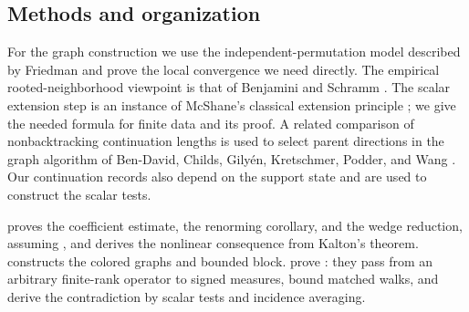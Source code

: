 \subsection{Methods and organization}

For the graph construction we use the independent-permutation model
described by Friedman \cite{Friedman04} and prove the local convergence
we need directly. The empirical rooted-neighborhood viewpoint is that
of Benjamini and Schramm \cite{BenjaminiSchramm01}. The scalar extension
step is an instance of McShane's classical extension principle
\cite{McShane34}; we give the needed formula for finite data and its proof.
A related comparison of nonbacktracking continuation lengths is used to
select parent directions in the graph algorithm of Ben-David, Childs,
Gily\'en, Kretschmer, Podder, and Wang
\cite[\S6.1.2]{BenDavidEtAl24}. Our continuation records also depend on
the support state and are used to construct the scalar tests.

 proves the coefficient estimate, the renorming
corollary, and the wedge reduction, assuming , and derives
the nonlinear consequence from Kalton's theorem.
 constructs the colored graphs and bounded block.
 prove :
they pass from an arbitrary finite-rank operator to signed measures,
bound matched walks, and derive the contradiction by scalar tests and
incidence averaging.
